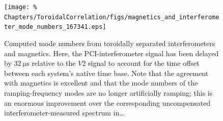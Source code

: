 \begin{figure}
  \centering
  \texttt{[image: \%
    Chapters/ToroidalCorrelation/figs/magnetics\_and\_interferometer\_mode\_numbers\_167341.eps]}
  \caption[Computed toroidal mode numbers \emph{after} removing time delay
      from \ldots  %
    ]{%
    Computed mode numbers from
    toroidally separated interferometers and magnetics.
    Here, the PCI-interferometer signal has been delayed by
    $\SI{32}{\micro\second}$ relative to the $V2$ signal
    to account for the time offset between each system's native time base.
    Note that the agreement with magnetics is excellent and that
    the mode numbers of the ramping-frequency modes are no longer
    artificially ramping;
    this is an enormous improvement over the corresponding
    uncompensated interferometer-measured spectrum in\ldots
  }
\label{fig:ToroidalCorrelation:compensated_time_delay}
\end{figure}


